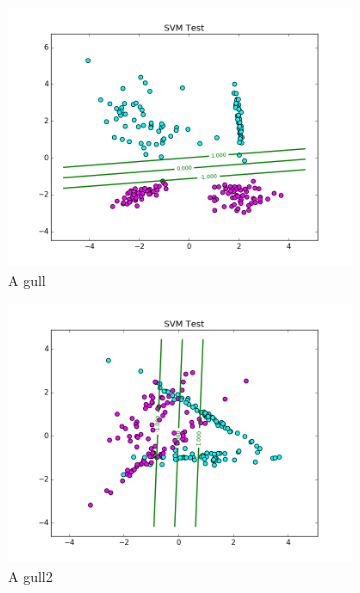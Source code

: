 \documentclass[10pt,twoside]{article}
\begin{document}
\begin{figure}
        \begin{subfigure}[b]{0.25\textwidth}
                \centering
                \includegraphics[width=\linewidth]{Figures/P2/svm_data1_test_C1.png}
                \caption{A gull}
                \label{fig:gull}
        \end{subfigure}%
        \begin{subfigure}[b]{0.25\textwidth}
                \centering
                \includegraphics[width=\linewidth]{Figures/P2/svm_data2_test_C1.png}
                \caption{A gull2}
                \label{fig:gull2}
        \end{subfigure}%
        \begin{subfigure}[b]{0.25\textwidth}

\end{subfigure}
\end{figure}
\end{document}

